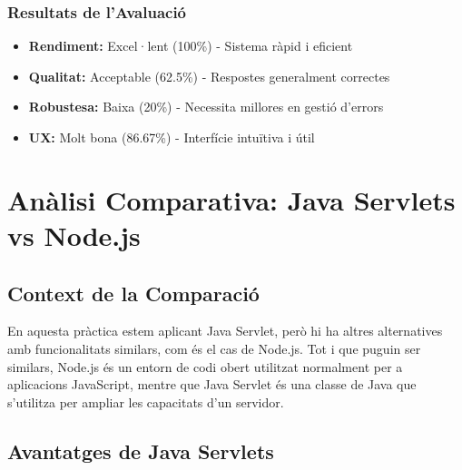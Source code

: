 \documentclass[12pt,a4paper]{article}
\begin{document}
\subsubsection{Resultats de l'Avaluació}

\begin{itemize}
    \item \textbf{Rendiment:} Excel·lent (100\%) - Sistema ràpid i eficient
    \item \textbf{Qualitat:} Acceptable (62.5\%) - Respostes generalment correctes
    \item \textbf{Robustesa:} Baixa (20\%) - Necessita millores en gestió d'errors
    \item \textbf{UX:} Molt bona (86.67\%) - Interfície intuïtiva i útil
\end{itemize}

\newpage
\section{Anàlisi Comparativa: Java Servlets vs Node.js}

\subsection{Context de la Comparació}

En aquesta pràctica estem aplicant Java Servlet, però hi ha altres alternatives amb funcionalitats similars, com és el cas de Node.js. Tot i que puguin ser similars, Node.js és un entorn de codi obert utilitzat normalment per a aplicacions JavaScript, mentre que Java Servlet és una classe de Java que s'utilitza per ampliar les capacitats d'un servidor.

\subsection{Avantatges de Java Servlets}
\end{document}
